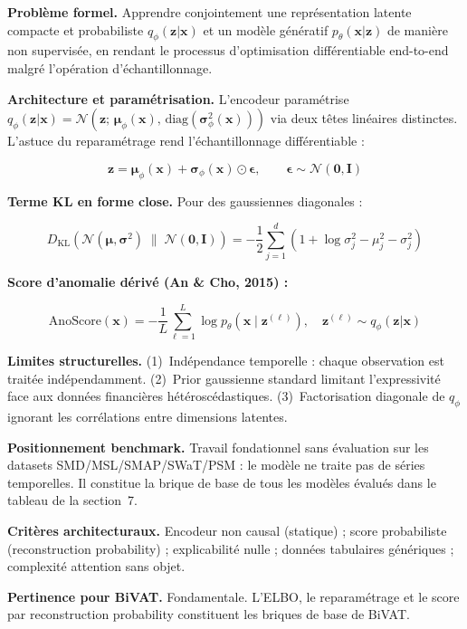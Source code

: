 \documentclass[12pt,a4paper]{article}
\begin{document}
\textbf{Problème formel.} Apprendre conjointement une représentation latente
compacte et probabiliste $q_\phi(\mathbf{z}|\mathbf{x})$ et un modèle génératif
$p_\theta(\mathbf{x}|\mathbf{z})$ de manière non supervisée, en rendant le
processus d'optimisation différentiable end-to-end malgré l'opération
d'échantillonnage.

\textbf{Architecture et paramétrisation.} L'encodeur paramétrise
$q_\phi(\mathbf{z}|\mathbf{x}) =
\mathcal{N}(\mathbf{z};\,\boldsymbol{\mu}_\phi(\mathbf{x}),\,
\mathrm{diag}(\boldsymbol{\sigma}^2_\phi(\mathbf{x})))$ via deux têtes
linéaires distinctes. L'astuce du reparamétrage rend l'échantillonnage
différentiable :

$$\mathbf{z} = \boldsymbol{\mu}_\phi(\mathbf{x}) +
\boldsymbol{\sigma}_\phi(\mathbf{x}) \odot \boldsymbol{\epsilon},
\qquad \boldsymbol{\epsilon} \sim \mathcal{N}(\mathbf{0}, \mathbf{I})$$

\textbf{Terme KL en forme close.} Pour des gaussiennes diagonales :

$$D_{\mathrm{KL}}\!\left(\mathcal{N}(\boldsymbol{\mu},\boldsymbol{\sigma}^2)
\;\|\; \mathcal{N}(\mathbf{0},\mathbf{I})\right) =
-\frac{1}{2}\sum_{j=1}^{d}\left(1 + \log\sigma_j^2 - \mu_j^2 -
\sigma_j^2\right)$$

\textbf{Score d'anomalie dérivé (An \& Cho, 2015) :}

$$\mathrm{AnoScore}(\mathbf{x}) = -\frac{1}{L}\sum_{\ell=1}^{L}
\log p_\theta\!\left(\mathbf{x}\mid\mathbf{z}^{(\ell)}\right),
\quad \mathbf{z}^{(\ell)} \sim q_\phi(\mathbf{z}|\mathbf{x})$$

\textbf{Limites structurelles.} (1)~Indépendance temporelle : chaque observation
est traitée indépendamment. (2)~Prior gaussienne standard limitant l'expressivité
face aux données financières hétéroscédastiques. (3)~Factorisation diagonale de
$q_\phi$ ignorant les corrélations entre dimensions latentes.

\textbf{Positionnement benchmark.} Travail fondationnel sans évaluation sur les
datasets SMD/MSL/SMAP/SWaT/PSM : le modèle ne traite pas de séries temporelles.
Il constitue la brique de base de tous les modèles évalués dans le tableau de
la section~7.

\textbf{Critères architecturaux.} Encodeur non causal (statique) ; score
probabiliste (reconstruction probability) ; explicabilité nulle ; données
tabulaires génériques ; complexité attention sans objet.

\textbf{Pertinence pour BiVAT.} Fondamentale. L'ELBO, le reparamétrage et le
score par reconstruction probability constituent les briques de base de BiVAT.
\end{document}
